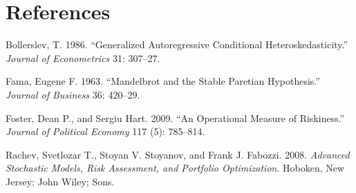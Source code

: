 \documentclass[11pt,]{article}
\begin{document}
\section*{References}\label{references}

\hypertarget{refs}{}
\hypertarget{ref-Bollerslev:1986}{}
Bollerslev, T. 1986. ``Generalized Autoregressive Conditional
Heteroskedasticity.'' \emph{Journal of Econometrics} 31: 307--27.

\hypertarget{ref-Fama:1963}{}
Fama, Eugene F. 1963. ``Mandelbrot and the Stable Paretian Hypothesis.''
\emph{Journal of Business} 36: 420--29.

\hypertarget{ref-FH:2009}{}
Foster, Dean P., and Sergiu Hart. 2009. ``An Operational Measure of
Riskiness.'' \emph{Journal of Political Economy} 117 (5): 785--814.

\hypertarget{ref-Rachev:2008}{}
Rachev, Svetlozar T., Stoyan V. Stoyanov, and Frank J. Fabozzi. 2008.
\emph{Advanced Stochastic Models, Risk Assessment, and Portfolio
Optimization}. Hoboken, New Jersey: John Wiley; Sons.
\end{document}
